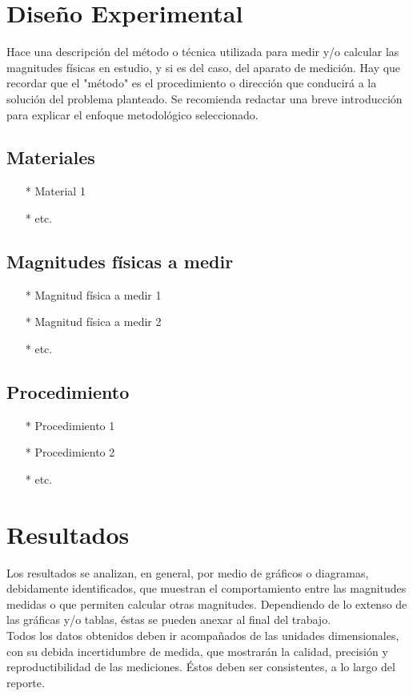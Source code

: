 \documentclass[letterpaper,11pt]{article}
\begin{document}
\section{Diseño Experimental}
%
Hace una descripción del método o técnica utilizada para medir y/o calcular las
magnitudes físicas en estudio, y si es del caso, del aparato de medición. Hay que
recordar que el "método" es el procedimiento o dirección que conducirá a la solución
del problema planteado. Se recomienda redactar una breve introducción para explicar
el enfoque metodológico seleccionado.
%
\subsection{Materiales}
\begin{itemize}
\item[*] Material 1
\item[*] etc.
\end{itemize}
%
\subsection{Magnitudes físicas a medir}
\begin{itemize}
\item[*] Magnitud física a medir 1
\item[*] Magnitud física a medir 2
\item[*] etc.
\end{itemize}
%
\subsection{Procedimiento}
\begin{enumerate}
\item[*] Procedimiento 1
\item[*] Procedimiento 2
\item[*] etc.
\end{enumerate}
%
\section{Resultados}
%
Los resultados se analizan, en general, por medio de gráficos o diagramas,
debidamente identificados, que muestran el comportamiento entre las magnitudes
medidas o que permiten calcular otras magnitudes. Dependiendo de lo extenso de las
gráficas y/o tablas, éstas se pueden anexar al final del trabajo.\\
%
Todos los datos obtenidos deben ir acompañados de las unidades dimensionales,
con su debida incertidumbre de medida, que mostrarán la calidad, precisión y
reproductibilidad de las mediciones. Éstos deben ser consistentes, a lo largo del
reporte.
%
\end{document}
